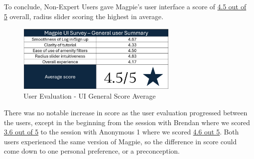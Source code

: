 \newpage{}

To conclude, Non-Expert Users gave Magpie's user interface a score of
\underline{4.5 out of 5} overall, radius slider scoring the highest in average.
\begin{figure}[h!]
  \centering
  \includegraphics[width=0.7\textwidth]{images/survey-casual-summary.png}
  \caption{User Evaluation - UI General Score Average}
\end{figure}

There was no notable increase in score as the user evaluation progressed between
the users, except in the beginning from the session with Brendan where we scored
\underline{3.6 out of 5} to the session with Anonymous 1 where we scored
\underline{4.6 out 5}. Both users experienced the same version of Magpie, so the
difference in score could come down to one personal preference, or a preconception.